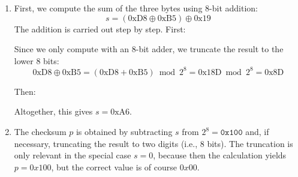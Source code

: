 \documentclass[a4paper,12pt]{article}
\begin{document}
\begin{enumerate}
    \item
	First, we compute the sum of the three bytes using 8-bit addition:
	\[
	    s = (\text{0xD8} \oplus \text{0xB5}) \oplus \text{0x19}
	\]
	The addition is carried out step by step. First:
	\begin{center}
	\end{center}
	\newpage
	Since we only compute with an 8-bit adder, we truncate the result to
	the lower 8 bits:
	\[
	    \text{0xD8} \oplus \text{0xB5}
	    = (\text{0xD8} + \text{0xB5}) \bmod 2^8
	    = \text{0x18D} \bmod 2^8 = \text{0x8D}
	\]

	Then:
	\begin{center}
	\end{center}

	Altogether, this gives $s = \text{0xA6}$.

    \item
	The checksum $p$ is obtained by subtracting $s$ from
	$2^8 = \texttt{0x100}$ and, if necessary, truncating the result to two
	digits (i.e., 8 bits). The truncation is only relevant in the special
	case $s = 0$, because then the calculation yields $p = 0x100$, but the
	correct value is of course $0x00$.

	\begin{center}
	\end{center}


\end{enumerate}
\end{document}
